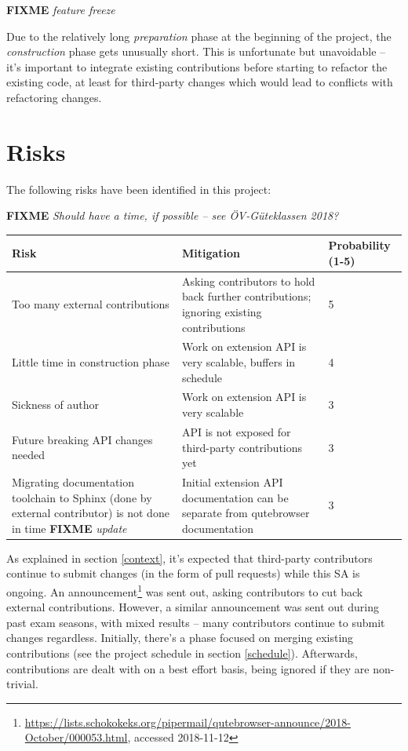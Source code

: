 \documentclass[a4paper,parskip=full]{scrreprt}
\newcommand{\fixme}[1]{\textbf{FIXME} \emph{#1}}
\begin{document}
\fixme{feature freeze}

Due to the relatively long \emph{preparation} phase at the beginning of the
project, the \emph{construction} phase gets unusually short. This is
unfortunate but unavoidable -- it's important to integrate existing
contributions before starting to refactor the existing code, at least for
third-party changes which would lead to conflicts with refactoring changes.

\section{Risks}
The following risks have been identified in this project:

\fixme{Should have a time, if possible -- see ÖV-Güteklassen 2018?}

\begin{table}[h!]
  \begin{tabulary}{\linewidth}{LLL}
    \toprule
    Risk & Mitigation & Probability (1-5) \\
    \midrule
    Too many external contributions & Asking contributors to hold back further contributions; ignoring existing contributions & 5 \\
    \hline
    Little time in construction phase & Work on extension API is very
    scalable, buffers in schedule & 4 \\
    \hline
    Sickness of author & Work on extension API is very scalable & 3 \\
    \hline
    Future breaking API changes needed & API is not exposed for third-party
    contributions yet & 3 \\
    \hline
    Migrating documentation toolchain to Sphinx (done by external contributor)
    is not done in time \fixme{update }& Initial extension API documentation can be separate from
    qutebrowser documentation & 3 \\
    \bottomrule
  \end{tabulary}
\end{table}

As explained in section \ref{context}, it's expected that third-party
contributors continue to submit changes (in the form of pull requests) while
this SA is ongoing. An
announcement\footnote{\url{https://lists.schokokeks.org/pipermail/qutebrowser-announce/2018-October/000053.html},
  accessed 2018-11-12} was sent out, asking contributors to cut back external
contributions. However, a similar announcement was sent out during past exam
seasons, with mixed results -- many contributors continue to submit changes
regardless. Initially, there's a phase focused on merging existing
contributions (see the project schedule in section \ref{schedule}). Afterwards,
contributions are dealt with on a best effort basis, being ignored if they
are non-trivial.
\end{document}
